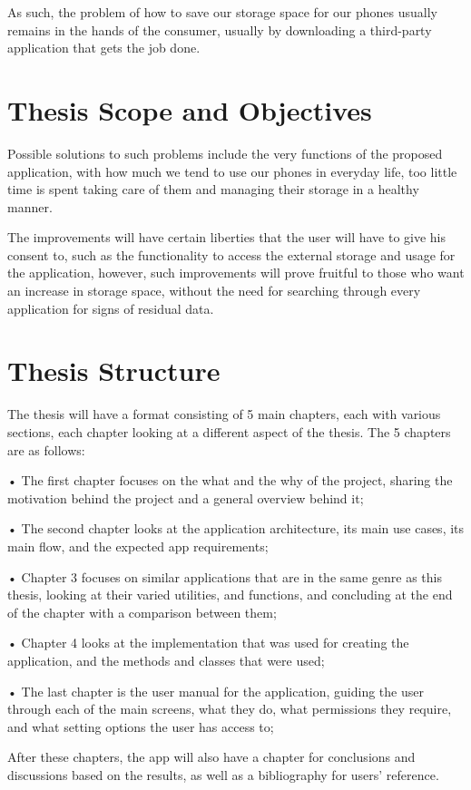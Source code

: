As such, the problem of how to save our storage space for our phones usually remains in the hands of the consumer, usually by downloading a third-party application that gets the job done. 
\newpage

\section{Thesis Scope and Objectives}\label{sect:Thesis Scope and Objectives}

Possible solutions to such problems include the very functions of the proposed application, with how much we tend to use our phones in everyday life, too little time is spent taking care of them and managing their storage in a healthy manner.

The improvements will have certain liberties that the user will have to give his consent to, such as the functionality to access the external storage and usage for the application, however, such improvements will prove fruitful to those who want an increase in storage space, without the need for searching through every application for signs of residual data.

\section{Thesis Structure}\label{sect:Thesis Structure}

The thesis will have a format consisting of 5 main chapters, each with various sections, each chapter looking at a different aspect of the thesis. The 5 chapters are as follows:

    • The first chapter focuses on the what and the why of the project, sharing the motivation behind the project and a general overview behind it;

    • The second chapter looks at the application architecture, its main use cases, its main flow, and the expected app requirements;

    • Chapter 3 focuses on similar applications that are in the same genre as this thesis, looking at their varied utilities, and functions, and concluding at the end of the chapter with a comparison between them;

    • Chapter 4  looks at the implementation that was used for creating the application, and the methods and classes that were used;

    • The last chapter is the user manual for the application, guiding the user through each of the main screens, what they do, what permissions they require, and what setting options the user has access to;

After these chapters, the app will also have a chapter for conclusions and discussions based on the results, as well as a bibliography for users' reference.